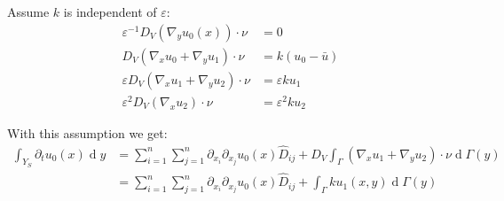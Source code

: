 \documentclass[10pt, a4paper]{article}
\begin{document}
Assume $k$ is independent of $\varepsilon$:
 \begin{align}
 \varepsilon^{-1}D_V(\nabla_y u_0(x)) \cdot \nu &= 0\\
 D_V(\nabla_x u_0 + \nabla_y u_1) \cdot \nu &= k(u_0- \bar{u}) \\
 \varepsilon D_V(\nabla_x u_1 + \nabla_y u_2) \cdot \nu &= \varepsilon k u_1 \\
 \varepsilon^2 D_V(\nabla_x u_2) \cdot \nu &= \varepsilon^2 k u_2
 \end{align}
 
 With this assumption we get:
 \begin{align}
 \label{integral2}
 \int_{Y_S}\partial_t u_0(x)\operatorname{d}y &= \sum_{i=1}^n\sum_{j=1}^n \partial_{x_i}\partial_{x_j}u_0(x) \hat D_{ij}+D_V \int_\Gamma (\nabla_x u_1 + \nabla_y u_2) \cdot \nu \operatorname{d} \Gamma(y)\\
  &= \sum_{i=1}^n\sum_{j=1}^n \partial_{x_i}\partial_{x_j}u_0(x) \hat D_{ij}+\int_\Gamma ku_1(x,y) \operatorname{d} \Gamma(y)\\
 \end{align}
 
 
%  
%  
 
 

% 
% 
 
 
%  
 
 
 
 
 
 
\end{document}
